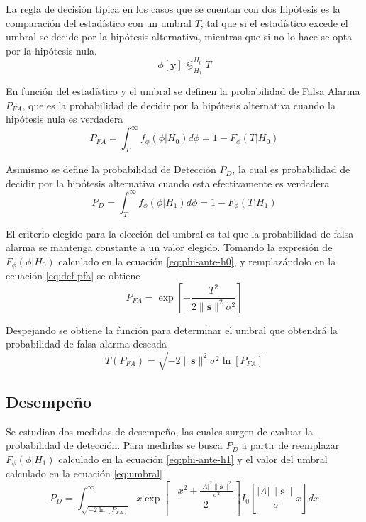 La regla de decisión típica en los casos que se cuentan con dos hipótesis es la comparación del estadístico con un umbral $T$, tal que si el estadístico excede el umbral se decide por la hipótesis alternativa, mientras que si no lo hace se opta por la hipótesis nula.
\begin{equation}
    \phi[\mathbf{y}]\mathop{\lessgtr}_{H_1}^{H_0}T
\end{equation}

En función del estadístico y el umbral se definen la probabilidad de Falsa Alarma $P_{FA}$, que es la probabilidad de decidir por la hipótesis alternativa cuando la hipótesis nula es verdadera
\begin{equation}
    P_{FA} = \int_T^\infty f_\phi(\phi|H_0)d\phi = 1 - F_\phi(T|H_0)    
\end{equation}

Asimismo se define la probabilidad de Detección $P_D$, la cual es probabilidad de decidir por la hipótesis alternativa cuando esta efectivamente es verdadera
\begin{equation}
    P_{D} = \int_T^\infty f_\phi(\phi|H_1)d\phi = 1 - F_\phi(T|H_1)
\end{equation}

El criterio elegido para la elección del umbral es tal que la probabilidad de falsa alarma se mantenga constante a un valor elegido. Tomando la expresión de $F_\phi(\phi|H_0)$ calculado en la ecuación \ref{eq:phi-ante-h0}, y remplazándolo en la ecuación \ref{eq:def-pfa} se obtiene
\begin{equation}
    P_{FA} = \exp\left[-\frac{T^2}{2\lVert\mathbf{s}\rVert^2 \sigma^2}\right]    
\end{equation}

Despejando se obtiene la función para determinar el umbral que obtendrá la probabilidad de falsa alarma deseada
\begin{equation}\label{eq:umbral}
    T(P_{FA}) = \sqrt{-2\lVert \mathbf{s}\rVert^2 \sigma^2 \ln\left[P_{FA}\right]}    
\end{equation}

\subsection{Desempeño}
\label{Ss:hipotesis-desempeño}
Se estudian dos medidas de desempeño, las cuales surgen de evaluar la probabilidad de detección. Para medirlas se busca $P_D$ a partir de reemplazar $F_\phi(\phi|H_1)$ calculado en la ecuación \ref{eq:phi-ante-h1} y el valor del umbral calculado en la ecuación \ref{eq:umbral}
\begin{equation}\label{eq:probabilidad-deteccion}
    P_D = \int_{\sqrt{-2 \ln\left[P_{FA}\right]}}^\infty x\exp\left[-\frac{x^2 + \frac{|A|^2\lVert\mathbf{s}\rVert^2}{\sigma^2}}{2}\right]I_0\left[\frac{|A|\lVert\mathbf{s}\rVert}{\sigma} x\right] dx
\end{equation}

